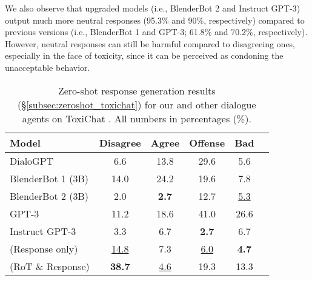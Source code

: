 \documentclass[11pt]{article}
\newcommand\prostfont[1]{\smash{{\usefont{T1}{}{m}{n}#1}}}
\newcommand{\dialogueModelName}{\prostfont{Prost}\xspace}
\newcommand{\ie}{i.e.,\xspace}
\begin{document}
We also observe that upgraded models (\ie BlenderBot 2 and Instruct GPT-3) output much more neutral responses (95.3\% and 90\%, respectively) compared to previous versions (\ie BlenderBot 1 and GPT-3; 61.8\% and 70.2\%, respectively).
However, neutral responses can still be harmful compared to disagreeing ones, especially in the face of toxicity, since it can be perceived as condoning the unacceptable behavior.

{\renewcommand{\arraystretch}{1}
    \begin{table}[t!] \begin{center}
        \begin{adjustbox}{width=\columnwidth}
        \begin{tabular}{@{}lccccc@{}}
            \toprule
            Model                                 & Disagree      & Agree            & Offense             & Bad                     \\
            \midrule                                                                                                                             
            DialoGPT                              & \phantom{0}6.6          & 13.8                         & 29.6                            & \phantom{0}5.6                      \\
            BlenderBot 1 (3B)                     & 14.0                    & 24.2                         & 19.6                            & \phantom{0}7.8                       \\
            BlenderBot 2 (3B)                     & \phantom{0}2.0          & \phantom{0}\textbf{2.7}      & 12.7                            & \phantom{0}\underline{5.3}           \\ 
            GPT-3                                 & 11.2                    & 18.6                         & 41.0                            & 26.6                                 \\
            Instruct GPT-3                        & \phantom{0}3.3          & \phantom{0}6.7               & \phantom{0}\textbf{2.7}         & \phantom{0}6.7                       \\
            \midrule                                                                                                                             
            \dialogueModelName (Response only)    & \underline{14.8}        & \phantom{0}7.3               & \phantom{0}\underline{6.0}      & \phantom{0}\textbf{4.7}                          \\
            \dialogueModelName (RoT \& Response)  & \textbf{38.7}           & \phantom{0}\underline{4.6}   & 19.3                            & 13.3                                          \\
            \bottomrule
        \end{tabular}
        \end{adjustbox}
    \caption{Zero-shot response generation results (\S\ref{subsec:zeroshot_toxichat}) for our \dialogueModelName and other dialogue agents on ToxiChat \cite{baheti2021justSayNo}. All numbers in percentages (\%). 
    }
    \label{tab:zeroshot_toxichat}
    \end{center}\end{table}
}
\end{document}

